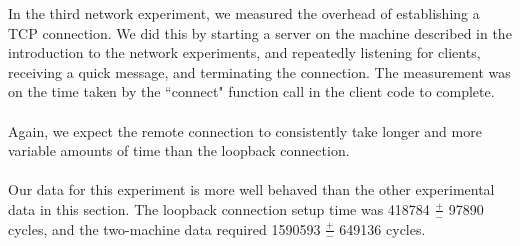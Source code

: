 \noindent In the third network experiment, we measured the overhead of establishing a TCP connection. We did this by starting a server on the machine described in the introduction to the network experiments, and repeatedly listening for clients, receiving a quick message, and terminating the connection. The measurement was on the time taken by the ``connect" function call in the client code to complete.
\\
\\
Again, we expect the remote connection to consistently take longer and more variable amounts of time than the loopback connection. 
\\
\\
Our data for this experiment is more well behaved than the other experimental data in this section. The loopback connection setup time was 418784 $\frac{+}{-}$ 97890 cycles, and the two-machine data required 1590593 $\frac{+}{-}$ 649136 cycles.